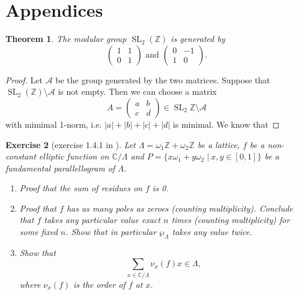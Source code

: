 \documentclass[a4paper]{article}
\theoremstyle{theoremdd}
\newtheorem{theorem}{Theorem}[section]
\theoremstyle{definitiondd}
\theoremstyle{remarkdd}
\newtheorem{exercise}[theorem]{Exercise}
\newcommand{\Z}{\mathbb{Z}}
\newcommand{\C}{\mathbb{C}}
\DeclareMathOperator{\SL}{SL}
\begin{document}
\section{Appendices}
\begin{theorem}
	The modular group $\SL_2(\Z)$ is generated by \[ 	
	\begin{pmatrix}  1 & 1 \\ 0 & 1 \end{pmatrix} 
	\text{ and }
	\begin{pmatrix} 0 & -1 \\ 1 & 0 \end{pmatrix} 
.\] 
\end{theorem}
\begin{proof}
	Let $\mathcal{A} $ be the group generated by the two matrices. 
	Suppose that $\SL_2(\Z) \setminus \mathcal{A} $ is not empty.
	Then we can choose a matrix \[
		A =\begin{pmatrix} a & b \\ c& d\end{pmatrix} \in \SL_2\Z \setminus \mathcal{A} 
	\] 
	with mimimal 1-norm, i.e. $|a| + |b| + |c| + |d|$ is minimal.
	We know that 
\end{proof}
\begin{exercise}[exercise 1.4.1 in \cite{diamondFirstCourseModular2005a}] \label{ex:1.4.1}
	Let $\Lambda = \omega_1 \Z + \omega_2 \Z$ be a lattice,  $f$ be a non-constant elliptic function on $\C / \Lambda$ and $P = \{x \omega_1 + y\omega_2 \;|\: x, y \in [0,1]\} $ be a fundamental parallellogram of $\Lambda$.
	 \begin{enumerate}
		\item Proof that the sum of residues on $f$ is 0. 
		\item Proof that $f$ has as many poles as zeroes (counting multiplicity). 
			Conclude that $f$ takes any particular value exact  $n$ times (counting multiplicity) for some fixed $n$. Show that in particular  $\wp_\Lambda$ takes any value twice.
		\item Show that 
			\[
				\sum_{x \in \C / \Lambda} \nu_x(f) x \in \Lambda
			,\]
			where $\nu_x(f)$ is the order of $f$ at  $x$. 
	\end{enumerate}
\end{exercise}
\end{document}
